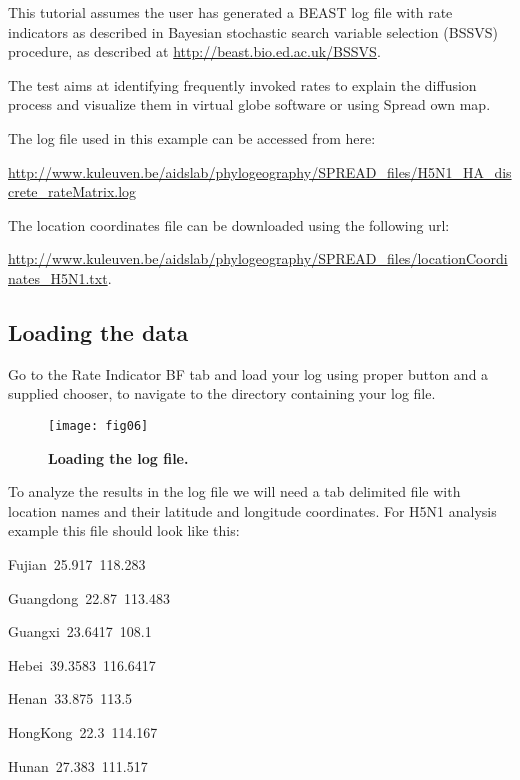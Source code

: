This tutorial assumes the user has generated a BEAST log file with
rate indicators as described in Bayesian stochastic search variable
selection (BSSVS) procedure, as described at \url{http://beast.bio.ed.ac.uk/BSSVS}.

The test aims at identifying frequently invoked rates to explain the
diffusion process and visualize them in virtual globe software or
using Spread own map. 

\noindent
The log file used in this example can be accessed from here:

\url{http://www.kuleuven.be/aidslab/phylogeography/SPREAD_files/H5N1_HA_discrete_rateMatrix.log}

\noindent
The location coordinates file can be downloaded using the following
url: 

\url{http://www.kuleuven.be/aidslab/phylogeography/SPREAD_files/locationCoordinates_H5N1.txt}.


\subsection{Loading the data}

Go to the Rate Indicator BF tab and load your log using proper button
and a supplied chooser, to navigate to the directory containing your
log file. 

\begin{figure}[H]
\begin{centering}
\texttt{[image: fig06]}
\caption{
{ \footnotesize 
{\bf Loading the log file.}
} %
}
\label{fig:06}
\par\end{centering}
\end{figure}

To analyze the results in the log file we will need a tab delimited
file with location names and their latitude and longitude coordinates.
For H5N1 analysis example this file should look like this:

\begin{lyxcode}
Fujian~25.917~118.283

Guangdong~22.87~113.483

Guangxi~23.6417~108.1

Hebei~39.3583~116.6417

Henan~33.875~113.5

HongKong~22.3~114.167

Hunan~27.383~111.517
\end{lyxcode}

